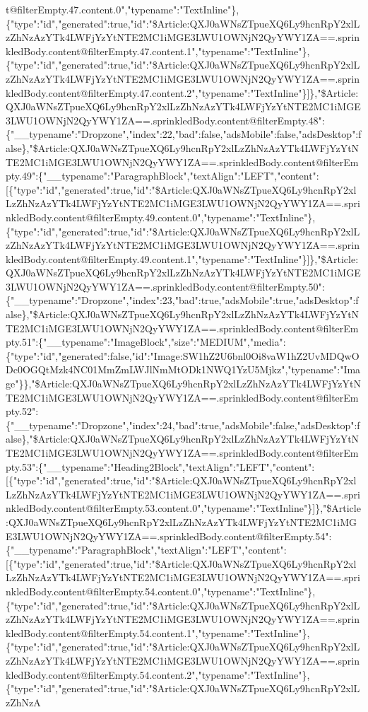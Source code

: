 t@filterEmpty.47.content.0","typename":"TextInline"\},\{"type":"id","generated":true,"id":"\$Article:QXJ0aWNsZTpueXQ6Ly9hcnRpY2xlLzZhNzAzYTk4LWFjYzYtNTE2MC1iMGE3LWU1OWNjN2QyYWY1ZA==.sprinkledBody.content@filterEmpty.47.content.1","typename":"TextInline"\},\{"type":"id","generated":true,"id":"\$Article:QXJ0aWNsZTpueXQ6Ly9hcnRpY2xlLzZhNzAzYTk4LWFjYzYtNTE2MC1iMGE3LWU1OWNjN2QyYWY1ZA==.sprinkledBody.content@filterEmpty.47.content.2","typename":"TextInline"\}{]}\},"\$Article:QXJ0aWNsZTpueXQ6Ly9hcnRpY2xlLzZhNzAzYTk4LWFjYzYtNTE2MC1iMGE3LWU1OWNjN2QyYWY1ZA==.sprinkledBody.content@filterEmpty.48":\{"\_\_typename":"Dropzone","index":22,"bad":false,"adsMobile":false,"adsDesktop":false\},"\$Article:QXJ0aWNsZTpueXQ6Ly9hcnRpY2xlLzZhNzAzYTk4LWFjYzYtNTE2MC1iMGE3LWU1OWNjN2QyYWY1ZA==.sprinkledBody.content@filterEmpty.49":\{"\_\_typename":"ParagraphBlock","textAlign":"LEFT","content":{[}\{"type":"id","generated":true,"id":"\$Article:QXJ0aWNsZTpueXQ6Ly9hcnRpY2xlLzZhNzAzYTk4LWFjYzYtNTE2MC1iMGE3LWU1OWNjN2QyYWY1ZA==.sprinkledBody.content@filterEmpty.49.content.0","typename":"TextInline"\},\{"type":"id","generated":true,"id":"\$Article:QXJ0aWNsZTpueXQ6Ly9hcnRpY2xlLzZhNzAzYTk4LWFjYzYtNTE2MC1iMGE3LWU1OWNjN2QyYWY1ZA==.sprinkledBody.content@filterEmpty.49.content.1","typename":"TextInline"\}{]}\},"\$Article:QXJ0aWNsZTpueXQ6Ly9hcnRpY2xlLzZhNzAzYTk4LWFjYzYtNTE2MC1iMGE3LWU1OWNjN2QyYWY1ZA==.sprinkledBody.content@filterEmpty.50":\{"\_\_typename":"Dropzone","index":23,"bad":true,"adsMobile":true,"adsDesktop":false\},"\$Article:QXJ0aWNsZTpueXQ6Ly9hcnRpY2xlLzZhNzAzYTk4LWFjYzYtNTE2MC1iMGE3LWU1OWNjN2QyYWY1ZA==.sprinkledBody.content@filterEmpty.51":\{"\_\_typename":"ImageBlock","size":"MEDIUM","media":\{"type":"id","generated":false,"id":"Image:SW1hZ2U6bnl0Oi8vaW1hZ2UvMDQwODc0OGQtMzk4NC01MmZmLWJlNmMtODk1NWQ1YzU5Mjkz","typename":"Image"\}\},"\$Article:QXJ0aWNsZTpueXQ6Ly9hcnRpY2xlLzZhNzAzYTk4LWFjYzYtNTE2MC1iMGE3LWU1OWNjN2QyYWY1ZA==.sprinkledBody.content@filterEmpty.52":\{"\_\_typename":"Dropzone","index":24,"bad":true,"adsMobile":false,"adsDesktop":false\},"\$Article:QXJ0aWNsZTpueXQ6Ly9hcnRpY2xlLzZhNzAzYTk4LWFjYzYtNTE2MC1iMGE3LWU1OWNjN2QyYWY1ZA==.sprinkledBody.content@filterEmpty.53":\{"\_\_typename":"Heading2Block","textAlign":"LEFT","content":{[}\{"type":"id","generated":true,"id":"\$Article:QXJ0aWNsZTpueXQ6Ly9hcnRpY2xlLzZhNzAzYTk4LWFjYzYtNTE2MC1iMGE3LWU1OWNjN2QyYWY1ZA==.sprinkledBody.content@filterEmpty.53.content.0","typename":"TextInline"\}{]}\},"\$Article:QXJ0aWNsZTpueXQ6Ly9hcnRpY2xlLzZhNzAzYTk4LWFjYzYtNTE2MC1iMGE3LWU1OWNjN2QyYWY1ZA==.sprinkledBody.content@filterEmpty.54":\{"\_\_typename":"ParagraphBlock","textAlign":"LEFT","content":{[}\{"type":"id","generated":true,"id":"\$Article:QXJ0aWNsZTpueXQ6Ly9hcnRpY2xlLzZhNzAzYTk4LWFjYzYtNTE2MC1iMGE3LWU1OWNjN2QyYWY1ZA==.sprinkledBody.content@filterEmpty.54.content.0","typename":"TextInline"\},\{"type":"id","generated":true,"id":"\$Article:QXJ0aWNsZTpueXQ6Ly9hcnRpY2xlLzZhNzAzYTk4LWFjYzYtNTE2MC1iMGE3LWU1OWNjN2QyYWY1ZA==.sprinkledBody.content@filterEmpty.54.content.1","typename":"TextInline"\},\{"type":"id","generated":true,"id":"\$Article:QXJ0aWNsZTpueXQ6Ly9hcnRpY2xlLzZhNzAzYTk4LWFjYzYtNTE2MC1iMGE3LWU1OWNjN2QyYWY1ZA==.sprinkledBody.content@filterEmpty.54.content.2","typename":"TextInline"\},\{"type":"id","generated":true,"id":"\$Article:QXJ0aWNsZTpueXQ6Ly9hcnRpY2xlLzZhNzA